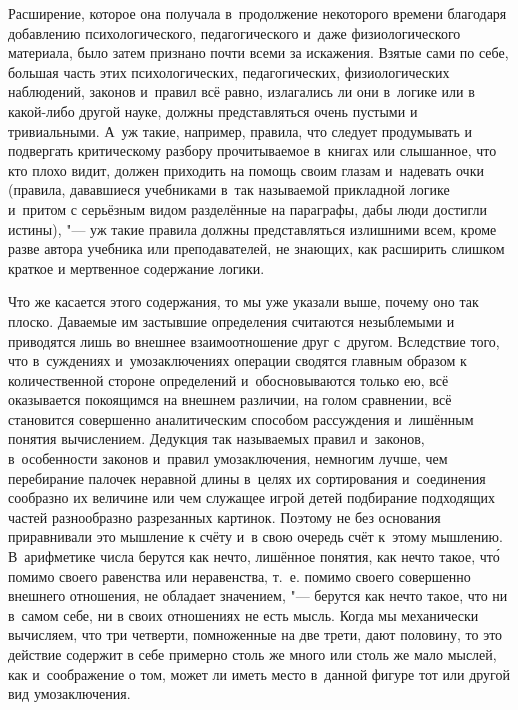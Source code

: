 Расширение, которое она получала в~продолжение некоторого времени благодаря
добавлению психологического, педагогического и~даже физиологического
материала, было затем признано почти всеми за искажения. Взятые сами по
себе, большая часть этих психологических, педагогических, физиологических
наблюдений, законов и~правил всё равно, излагались ли они в~логике или в
какой-либо другой науке, должны представляться очень пустыми и
тривиальными. А~уж такие, например, правила, что следует продумывать и
подвергать критическому разбору прочитываемое в~книгах или слышанное, что
кто плохо видит, должен приходить на помощь своим глазам и~надевать очки
(правила, дававшиеся учебниками в~так называемой прикладной логике и~притом
с серьёзным видом разделённые на параграфы, дабы люди достигли истины), "---
уж такие правила должны представляться излишними всем, кроме разве автора
учебника или преподавателей, не знающих, как расширить слишком краткое и
мертвенное содержание логики.

Что же касается этого содержания, то мы уже указали выше, почему оно так
плоско. Даваемые им застывшие определения считаются незыблемыми и
приводятся лишь во внешнее взаимоотношение друг с~другом. Вследствие того,
что в~суждениях и~умозаключениях операции сводятся главным образом к
количественной стороне определений и~обосновываются только ею, всё
оказывается покоящимся на внешнем различии, на голом сравнении, всё
становится совершенно аналитическим способом рассуждения и~лишённым понятия
вычислением. Дедукция так называемых правил и~законов, в~особенности
законов и~правил умозаключения, немногим лучше, чем перебирание палочек
неравной длины в~целях их сортирования и~соединения сообразно их величине
или чем служащее игрой детей подбирание подходящих частей разнообразно
разрезанных картинок. Поэтому не без основания приравнивали это мышление к
счёту и~в свою очередь счёт к~этому мышлению. В~арифметике числа берутся
как нечто, лишённое понятия, как нечто такое, чт\'{о} помимо своего равенства
или неравенства, т.~е. помимо своего совершенно внешнего отношения, не
обладает значением, "--- берутся как нечто такое, что ни в~самом себе, ни в
своих отношениях не есть мысль. Когда мы механически вычисляем, что три
четверти, помноженные на две трети, дают половину, то это действие содержит
в себе примерно столь же много или столь же мало мыслей, как и~соображение
о том, может ли иметь место в~данной фигуре тот или другой вид умозаключения.

